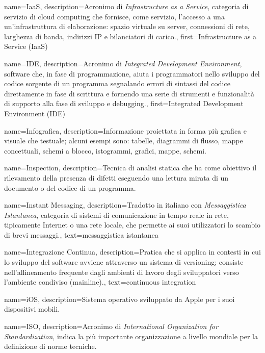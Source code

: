 {
name={IaaS},
description={Acronimo di \textit{Infrastructure as a Service}, categoria di servizio di cloud computing che fornisce, come servizio, l'accesso a una un'infrastruttura di elaborazione: spazio virtuale su server, connessioni di rete, larghezza di banda, indirizzi IP e bilanciatori di carico.},
first={Infrastructure as a Service (IaaS)}
}

{
name={IDE},
description={Acronimo di \textit{Integrated Development Environment}, software che, in fase di programmazione, aiuta i programmatori nello sviluppo del codice sorgente di un programma segnalando errori di sintassi del codice direttamente in fase di scrittura e fornendo una serie di strumenti e funzionalità di supporto alla fase di sviluppo e debugging.},
first={Integrated Development Environment (IDE)}
}

{
name={Infografica},
description={Informazione proiettata in forma più grafica e visuale che testuale; alcuni esempi sono: tabelle, diagrammi di flusso, mappe concettuali, schemi a blocco, istogrammi, grafici, mappe, schemi.}
}

{
name={Inspection},
description={Tecnica di analisi statica che ha come obiettivo il rilevamento della presenza di difetti eseguendo una lettura mirata di un documento o del codice di un programma.}
}

{
name={Instant Messaging},
description={Tradotto in italiano con \textit{Messaggistica Istantanea}, categoria di sistemi di comunicazione in tempo reale in rete, tipicamente Internet o una rete locale, che permette ai suoi utilizzatori lo scambio di brevi messaggi.},
text={messaggistica istantanea}
}

{
name={Integrazione Continua},
description={Pratica che si applica in contesti in cui lo sviluppo del software avviene attraverso un sistema di versioning; consiste nell'allineamento frequente dagli ambienti di lavoro degli sviluppatori verso l'ambiente condiviso (mainline).},
text={continuous integration}
}

{
name={iOS},
description={Sistema operativo sviluppato da Apple per i suoi dispositivi mobili.}
}

{
name={ISO},
description={Acronimo di \textit{International Organization for Standardization}, indica la più importante organizzazione a livello mondiale per la definizione di norme tecniche.}
}


